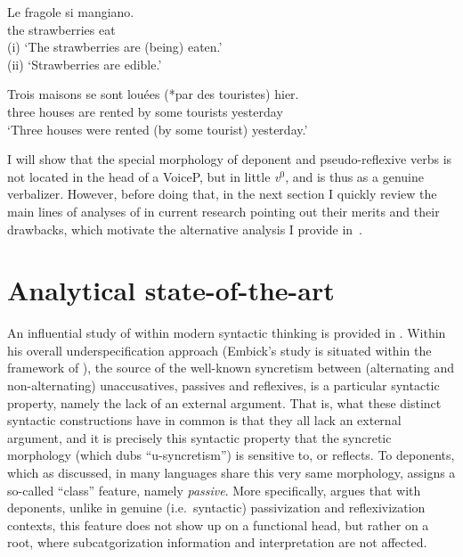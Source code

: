 \documentclass[output=paper]{langsci/langscibook}
\begin{document}
\ea\label{ex:key:10.11} 
    \sn
    \gll Le  fragole      si    mangiano.\\
        the strawberries  \Refl{}  eat\\
    \glt (i) ‘The strawberries are (being) eaten.’\\
        (ii) ‘Strawberries are edible.’
\z

\ea\label{ex:key:10.12} 
    \sn
    \gll Trois maisons  se    sont  louées (*par des touristes) hier.\\
        three houses \Refl{}  are  rented \hphantom{(*}by some tourists yesterday\\
    \glt ‘Three houses were rented (by some tourist) yesterday.’
\z

I will show that the special morphology of deponent and pseudo-reflexive verbs
is not located in the head of a VoiceP, but in little \emph{v}$^0$, and is thus
as a genuine verbalizer. However, before doing that, in the next section I
quickly review the main lines of analyses of  in current research
pointing out their merits and their drawbacks, which motivate the alternative
analysis I provide in~.

\section{Analytical state-of-the-art}\label{sec:key:10.3}

An influential study of  within modern syntactic thinking is
pro\-vi\-ded in \citet{Embick1997}. Within his overall underspecification
approach (Embick’s study is situated within the framework of ), the source of the well-known syncretism between (alternating and
non-alternating) unaccusatives, passives and reflexives, is a particular
syntactic property, namely the lack of an external argument. That is, what
these distinct syntactic constructions have in common is that they all lack an
external argument, and it is precisely this syntactic property that the
syncretic morphology (which \citeauthor{Embick1997} dubs “u-syn\-cre\-tism”) is
sensitive to, or reflects. To deponents, which as discussed, in many languages
share this very same morphology, \citeauthor{Embick1997} assigns a so-called
“class” feature, namely \emph{passive}. More specifically,
\citeauthor{Embick1997} argues that with deponents, unlike in genuine (i.e.\
syntactic) passivization and reflexivization contexts, this feature does not
show up on a functional head\is{functional items}, but rather on a root, where subcatgorization
information and interpretation are not affected.
\end{document}
